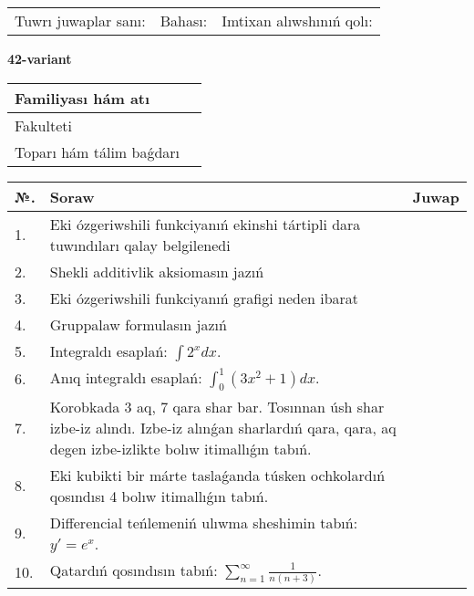 \documentclass{article}
\begin{document}
\vspace{1cm}

\begin{tabular}{ c c c }
Tuwrı juwaplar sanı: \underline{\hspace{2cm}} & Bahası: \underline{\hspace{2cm}} & Imtixan alıwshınıń qolı: \underline{\hspace{2cm}} \\
\end{tabular}

\newpage

\begin{center}\textbf{42-variant}\end{center}

\bgroup
\def\arraystretch{1.5}
\begin{tabular}{ |m{6cm}|m{10cm}| }
  \hline
  Familiyası hám atı & \\
  \hline
  Fakulteti &\\
  \hline
  Toparı hám tálim baǵdarı & \\
  \hline
\end{tabular}
\egroup

\vspace{0.5cm}

\bgroup
\def\arraystretch{2}
\begin{tabular}{ |l|m{8cm}|m{7cm}| }
  \hline
  №. & Soraw & Juwap \\
  \hline
  1. & Eki ózgeriwshili funkciyanıń ekinshi tártipli dara tuwındıları qalay belgilenedi &  \\
  \hline
  2. & Shekli additivlik aksiomasın jazıń &  \\
  \hline
  3. & Eki ózgeriwshili funkciyanıń grafigi neden ibarat &  \\
  \hline
  4. & Gruppalaw formulasın jazıń &  \\
  \hline
  5. & Integraldı esaplań: $\displaystyle\int {2^{x}dx} $. &  \\
  \hline
  6. & Anıq integraldı esaplań: $\displaystyle\int_{0}^{1}{(3x^{2} + 1)dx}$. &  \\
  \hline
  7. & Korobkada 3 aq, 7 qara shar bar. Tosınnan úsh shar izbe-iz alındı. Izbe-iz alınǵan sharlardıń qara, qara, aq degen izbe-izlikte bolıw itimallıǵın tabıń. &  \\
  \hline
  8. & Eki kubikti bir márte taslaǵanda túsken ochkolardıń qosındısı 4 bolıw itimallıǵın tabıń. &  \\
  \hline
  9. & Differencial teńlemeniń ulıwma sheshimin tabıń: $y'=e^{x}$. &  \\
  \hline
  10. & Qatardıń qosındısın tabıń: $\displaystyle\sum_{n = 1}^{\infty}\frac{1}{n(n + 3)}$. &  \\
  \hline
\end{tabular}
\egroup
\end{document}
